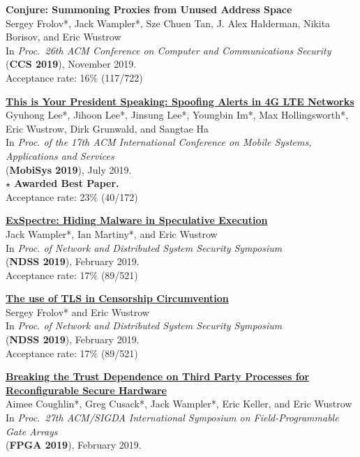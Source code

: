 \documentclass[margin,11pt]{res} %
\begin{document}
    \textbf{Conjure: Summoning Proxies from Unused Address Space} \\
    Sergey Frolov*, Jack Wampler*, Sze Chuen Tan, J. Alex Halderman, Nikita Borisov, and Eric Wustrow \\
    In \emph{Proc.\ 26th ACM Conference on Computer and Communications Security} \\
    (\textbf{CCS 2019}), November 2019. \\
    Acceptance rate: 16\% (117/722)

    \textbf{\href{https://ericw.us/trow/lte-alerts.pdf}{This is Your President Speaking: Spoofing Alerts in 4G LTE Networks}} \\
    Gyuhong Lee*, Jihoon Lee*, Jinsung Lee*, Youngbin Im*, Max Hollingsworth*, Eric Wustrow, Dirk Grunwald, and Sangtae Ha \\
    In \emph{Proc. of the 17th ACM International Conference on Mobile Systems, Applications and Services} \\
    (\textbf{MobiSys 2019}), July 2019. \\
    \textbf{$\star$ Awarded Best Paper.} \\
    Acceptance rate: 23\% (40/172)

    \textbf{\href{https://www.ndss-symposium.org/wp-content/uploads/2019/02/ndss2019_02B-5_Wampler_paper.pdf}{ExSpectre: Hiding Malware in Speculative Execution}} \\
    Jack Wampler*, Ian Martiny*, and Eric Wustrow \\
    In \emph{Proc. of Network and Distributed System Security Symposium} \\
    (\textbf{NDSS 2019}), February 2019. \\
    Acceptance rate: 17\% (89/521)

    \textbf{\href{https://tlsfingerprint.io}{The use of TLS in Censorship Circumvention}} \\
    Sergey Frolov* and Eric Wustrow \\
    In \emph{Proc. of Network and Distributed System Security Symposium} \\
    (\textbf{NDSS 2019}), February 2019. \\
    Acceptance rate: 17\% (89/521)


    \textbf{\href{https://ericw.us/sdsh\_fpga2019.pdf}{Breaking the Trust Dependence on Third Party Processes for Reconfigurable Secure Hardware}} \\
    Aimee Coughlin*, Greg Cusack*, Jack Wampler*, Eric Keller, and Eric Wustrow \\
    In \emph{Proc.\ 27th ACM/SIGDA International Symposium on Field-Programmable Gate Arrays}\\
    (\textbf{FPGA 2019}), February 2019. \\
\end{document}
